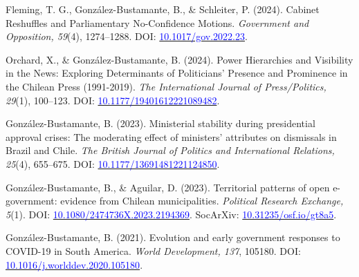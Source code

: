 \begin{publications}

\begin{benumerate}{8}

\item{Fleming, T. G., González-Bustamante, B., \& Schleiter, P. (2024). Cabinet Reshuffles and Parliamentary No-Confidence Motions. {\itshape Government and Opposition, 59}(4), 1274--1288. DOI: \href{https://doi.org/10.1017/gov.2022.23}{\textcolor{blue}{10.1017/gov.2022.23}}.}\vspace{1mm}

\item{Orchard, X., \& González-Bustamante, B. (2024). Power Hierarchies and Visibility in the News: Exploring Determinants of Politicians’ Presence and Prominence in the Chilean Press (1991-2019). {\itshape The International Journal of Press/Politics, 29}(1), 100--123. DOI: \href{https://doi.org/10.1177/19401612221089482}{\textcolor{blue}{10.1177/19401612221089482}}.}\vspace{1mm}

\item{González-Bustamante, B. (2023). Ministerial stability during presidential approval crises: The moderating effect of ministers' attributes on dismissals in Brazil and Chile. {\itshape The British Journal of Politics and International Relations, 25}(4), 655--675. DOI: \href{https://doi.org/10.1177/13691481221124850}{\textcolor{blue}{10.1177/13691481221124850}}.}\vspace{1mm}

\item{González-Bustamante, B., \& Aguilar, D. (2023). Territorial patterns of open e-government: evidence from Chilean municipalities. {\itshape Political Research Exchange, 5}(1). DOI: \href{https://doi.org/10.1080/2474736X.2023.2194369}{\textcolor{blue}{10.1080/2474736X.2023.2194369}}. SocArXiv: \href{https://doi.org/10.31235/osf.io/gt8a5}{\textcolor{blue}{10.31235/osf.io/gt8a5}}.}\vspace{1mm}

\item{González-Bustamante, B. (2021). Evolution and early government responses to COVID-19 in South America. {\itshape World Development, 137}, 105180. DOI: \href{https://doi.org/10.1016/j.worlddev.2020.105180}{\textcolor{blue}{10.1016/j.worlddev.2020.105180}}.}\vspace{1mm}



\end{benumerate}
\end{publications}
